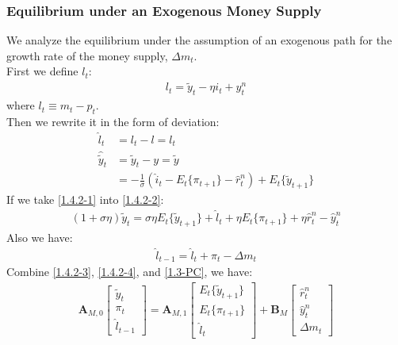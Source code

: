 \documentclass{article}
\numberwithin{equation}{section}
\begin{document}
\subsubsection{Equilibrium under an Exogenous Money Supply}
We analyze the equilibrium under the assumption of an exogenous path for the growth rate of the money supply, $\Delta m_t$.\\
First we define $l_t$:
	\begin{align}
		l_t = \tilde{y}_t - \eta i_t + y^n_t \label{1.4.2-1}
	\end{align}
where $l_t \equiv m_t - p_t$.\\
Then we rewrite it in the form of deviation:
	\begin{align}
		\hat{l}_t &= l_t - l = l_t \nonumber\\
		\hat{\tilde{y}}_t &= \tilde{y}_t - y = \tilde{y} \nonumber\\
		&= -\frac{1}{\sigma}(\hat{i}_t - E_t\{\pi_{t+1}\} - \hat{r}^n_t) + E_t\{\tilde{y}_{t+1}\} \label{1.4.2-2}
	\end{align}
If we take \eqref{1.4.2-1} into \eqref{1.4.2-2}:
	\begin{align}
		(1 + \sigma\eta)\tilde{y}_t = \sigma\eta E_t\{\tilde{y}_{t+1}\} + \hat{l}_t + \eta E_t\{\pi_{t+1}\} + \eta \hat{r}^n_t - \hat{y}^n_t \label{1.4.2-3}
	\end{align}
Also we have:
	\begin{align}
		\hat{l}_{t-1} = \hat{l}_t + \pi_t - \Delta m_t \label{1.4.2-4}
	\end{align}
Combine \eqref{1.4.2-3}, \eqref{1.4.2-4}, and \eqref{1.3-PC}, we have:
	\begin{align}
		\textbf{A}_{M,0}\begin{bmatrix} 
							\tilde{y}_t\\
							\pi_t\\
							\hat{l}_{t-1}
						\end{bmatrix} = 
		\textbf{A}_{M,1}\begin{bmatrix}
							E_t\{\tilde{y}_{t+1}\}\\
							E_t\{\pi_{t+1}\}\\
							\hat{l}_t
						\end{bmatrix} +
		\textbf{B}_{M}  \begin{bmatrix}
							\hat{r}^n_t\\
							\hat{y}^n_t\\
							\Delta m_t	
						\end{bmatrix} \label{1.4.2-eqs}
	\end{align}
\end{document}
